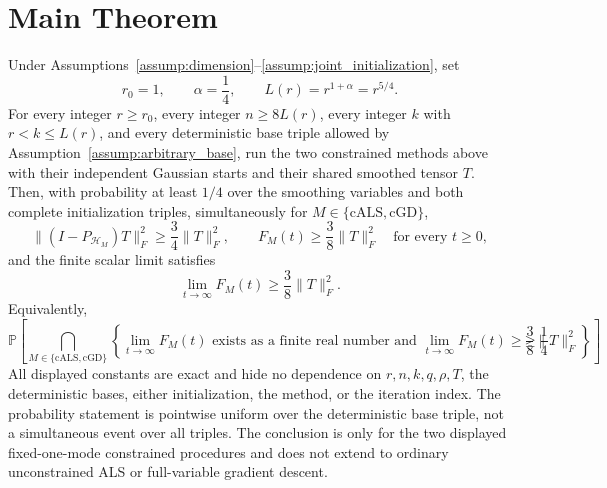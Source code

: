 \section{Main Theorem}

\begin{theorem}\label{thm:main}
Under Assumptions~\ref{assump:dimension}--\ref{assump:joint_initialization},
set
\[
 r_0=1,
 \qquad
 \alpha=\frac14,
 \qquad
 L(r)=r^{1+\alpha}=r^{5/4}.
\]
For every integer $r\ge r_0$, every integer $n\ge8L(r)$, every integer
$k$ with $r<k\le L(r)$, and every deterministic base triple allowed by
Assumption~\ref{assump:arbitrary_base}, run the two constrained methods above
with their independent Gaussian starts and their shared smoothed tensor $T$.
Then, with probability at least $1/4$ over the smoothing variables and both
complete initialization triples, simultaneously for
$M\in\{\mathrm{cALS},\mathrm{cGD}\}$,
\[
 \|(I-P_{\mathcal H_M})T\|_F^2\ge\frac34\|T\|_F^2,
 \qquad
 F_M(t)\ge\frac38\|T\|_F^2\quad\text{for every }t\ge0,
\]
and the finite scalar limit satisfies
\[
 \lim_{t\to\infty}F_M(t)\ge\frac38\|T\|_F^2.
\]
Equivalently,
\[
 \mathbb P\!\left[
 \bigcap_{M\in\{\mathrm{cALS},\mathrm{cGD}\}}
 \left\{
 \lim_{t\to\infty}F_M(t)\text{ exists as a finite real number and }
 \lim_{t\to\infty}F_M(t)\ge\frac38\|T\|_F^2
 \right\}
 \right]\ge\frac14.
\]
All displayed constants are exact and hide no dependence on
$r,n,k,q,\rho,T$, the deterministic bases, either initialization, the method,
or the iteration index.  The probability statement is pointwise uniform over
the deterministic base triple, not a simultaneous event over all triples.
The conclusion is only for the two displayed fixed-one-mode constrained
procedures and does not extend to ordinary unconstrained ALS or full-variable
gradient descent.
\end{theorem}
